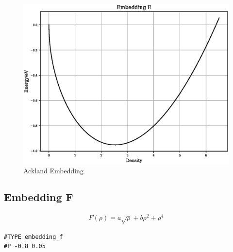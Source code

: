 \FloatBarrier
\begin{figure}[h]
  \begin{center}
    \includegraphics[scale=0.5]{appendix/functions/plots/embedding_e.eps}
    \caption{Ackland Embedding}
    \label{graph:graph1}
  \end{center}
\end{figure}
\FloatBarrier





\subsection{Embedding F}

\begin{equation}
\begin{split}
F(\rho) = a \sqrt{\rho} + b \rho^2 + \rho^4
\end{split}
\label{eq:embeddingF}
\end{equation}

\begin{lstlisting}[style=pseudocode,caption={Embedding F}]
#TYPE embedding_f
#P -0.8 0.05
\end{lstlisting}

